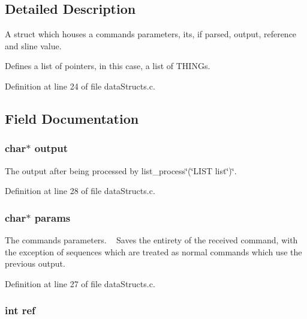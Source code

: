 \subsection{Detailed Description}
A struct which houses a command\textquotesingle{}s parameters, it\textquotesingle{}s, if parsed, output, reference and sline value. 

Defines a list of pointers, in this case, a list of T\+H\+I\+N\+Gs. 

Definition at line 24 of file data\+Structs.\+c.



\subsection{Field Documentation}
\subsubsection[{\texorpdfstring{output}{output}}]{\setlength{\rightskip}{0pt plus 5cm}char$\ast$ output}\hypertarget{structthing_a47866494eb84961e021291efbea9b569}{}\label{structthing_a47866494eb84961e021291efbea9b569}


The output after being processed by list\+\_\+process\char`\"{}(\char`\"{}L\+I\+ST list\char`\"{})\char`\"{}. 



Definition at line 28 of file data\+Structs.\+c.

\subsubsection[{\texorpdfstring{params}{params}}]{\setlength{\rightskip}{0pt plus 5cm}char$\ast$ params}\hypertarget{structthing_a0d119d211b6770402e90c832e7d03767}{}\label{structthing_a0d119d211b6770402e90c832e7d03767}


The command\textquotesingle{}s parameters.  ~\newline
 Saves the entirety of the received command, with the exception of sequences which are treated as normal commands which use the previous\textquotesingle{} output. 



Definition at line 27 of file data\+Structs.\+c.

\subsubsection[{\texorpdfstring{ref}{ref}}]{\setlength{\rightskip}{0pt plus 5cm}int ref}\hypertarget{structthing_adb528a1cb1ca190150183394d082590d}{}\label{structthing_adb528a1cb1ca190150183394d082590d}


